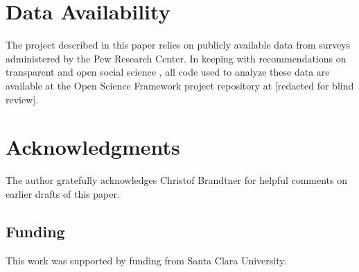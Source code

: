 \documentclass[11pt]{article}
\begin{document}
\section{Data Availability}\label{sec:data-availability}

The project described in this paper relies on publicly available data from
surveys administered by the Pew Research Center.
In keeping with recommendations on transparent and open social science
\citep{Freese2018}, all code used to analyze these data are available at the
Open Science Framework project repository at [redacted for blind review].


\section{Acknowledgments}\label{sec:acknowledgments}

The author gratefully acknowledges Christof Brandtner for helpful comments on
earlier drafts of this paper.


\subsection{Funding}\label{sec:funding}
This work was supported by funding from Santa Clara University.


\newpage
\hypertarget{references}{%
\label{references}}
\renewcommand{\bibname}{References}



\end{document}
